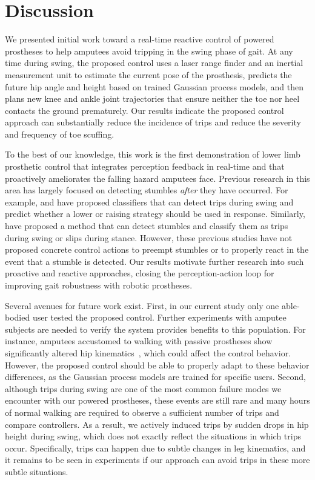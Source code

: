 \section{Discussion}

We presented initial work toward a real-time reactive control of powered
prostheses to help amputees avoid tripping in the swing phase of gait. At any
time during swing, the proposed control uses a laser range finder and an
inertial measurement unit to estimate the current pose of the prosthesis,
predicts the future hip angle and height based on trained Gaussian process
models, and then plans new knee and ankle joint trajectories that ensure neither
the toe nor heel contacts the ground prematurely. Our results indicate the
proposed control approach can substantially reduce the incidence of trips and
reduce the severity and frequency of toe scuffing.

To the best of our knowledge, this work is the first demonstration of lower limb
prosthetic control that integrates perception feedback in real-time and that
proactively ameliorates the falling hazard amputees face. Previous research in
this area has largely focused on detecting stumbles \emph{after} they have
occurred. For example, \citet{lawson2010stumble} and \citet{shirota2014recovery}
have proposed classifiers that can detect trips during swing and predict whether
a lower or raising strategy should be used in response. Similarly,
\citet{zhang2011towards} have proposed a method that can detect stumbles and
classify them as trips during swing or slips during stance. However, these
previous studies have not proposed concrete control actions to preempt stumbles
or to properly react in the event that a stumble is detected. Our results
motivate further research into such proactive and reactive approaches, closing
the perception-action loop for improving gait robustness with robotic
prostheses.

Several avenues for future work exist. First, in our current study only one
able-bodied user tested the proposed control. Further experiments with amputee
subjects are needed to verify the system provides benefits to this population.
For instance, amputees accustomed to walking with passive prostheses show
significantly altered hip kinematics~\citep{jaegers1995prosthetic}, which could
affect the control behavior. However, the proposed control should be able to
properly adapt to these behavior differences, as the Gaussian process models are
trained for specific users. Second, although trips during swing are one of the
most common failure modes we encounter with our powered prostheses, these events
are still rare and many hours of normal walking are required to observe a
sufficient number of trips and compare controllers. As a result, we actively
induced trips by sudden drops in hip height during swing, which does not exactly
reflect the situations in which trips occur.  Specifically, trips can happen due
to subtle changes in leg kinematics, and it remains to be seen in experiments if
our approach can avoid trips in these more subtle situations.

